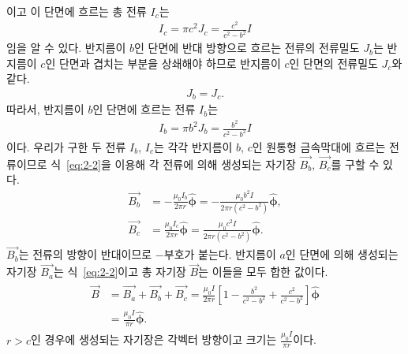 \documentclass[tightenlines,floatfix,nofootinbib,superscriptaddress,fleqn]{revtex4}
\begin{document}
\begin{itemize}
\begin{align}
  \end{align}
  이고 이 단면에 흐르는 총 전류 $I_c$는
  \begin{align}
    I_c = \pi c^2 J_c = \frac{c^2}{c^2-b^2}I
  \end{align}
  임을 알 수 있다. 반지름이 $b$인 단면에 반대 방향으로 흐르는 전류의 전류밀도
  $J_b$는 반지름이 $c$인 단면과 겹치는 부분을 상쇄해야 하므로 반지름이 $c$인
  단면의 전류밀도 $J_c$와 같다.
  \begin{align}
    J_b = J_c.
  \end{align}
  따라서, 반지름이 $b$인 단면에 흐르는 전류 $I_b$는
  \begin{align}
    I_b = \pi b^2 J_b = \frac{b^2}{c^2-b^2}I
  \end{align}
  이다. 우리가 구한 두 전류 $I_b$, $I_c$는 각각 반지름이 $b$, $c$인
  원통형 금속막대에 흐르는 전류이므로 식~\eqref{eq:2-2}을 이용해 
  각 전류에 의해 생성되는 자기장 $\vec{B_b}$, $\vec{B_c}$를 구할 수 있다.
  \begin{align}
    \vec{B_b} &= -\frac{\mu_0 I_b}{2\pi r}\hat{\bm \phi}
    =-\frac{\mu_0 b^2 I}{2\pi r(c^2-b^2)}\hat{\bm \phi}
    , \\
    \vec{B_c} &=  \frac{\mu_0 I_c}{2\pi r}\hat{\bm \phi}
    = \frac{\mu_0 c^2 I}{2\pi r(c^2-b^2)}\hat{\bm \phi}.
  \end{align}
  $\vec{B_b}$는 전류의 방향이 반대이므로 $-$부호가 붙는다. 반지름이 $a$인
  단면에 의해 생성되는 자기장 $\vec{B_a}$는 식~\eqref{eq:2-2}이고
  총 자기장 $\vec{B}$는 이들을 모두 합한 값이다.
  \begin{align}
    \begin{split}
      \vec{B} &= \vec{B_a}+\vec{B_b}+\vec{B_c}
      =\frac{\mu_0 I}{2\pi r}\left[1
      -\frac{b^2 }{c^2-b^2}
      +\frac{c^2 }{c^2-b^2}\right]\hat{\bm \phi}  \\
      &=\frac{\mu_0 I}{\pi r}\hat{\bm \phi}.
    \end{split}
  \end{align}
  $r>c$인 경우에 생성되는 자기장은 각벡터 방향이고 크기는 
  $\frac{\mu_0 I}{\pi r}$이다.

\end{itemize}
\end{document}
